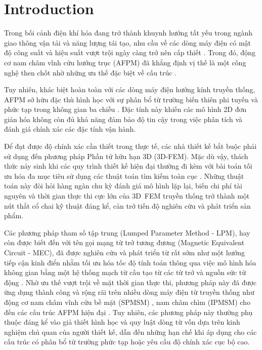 \section{Introduction}
Trong bối cảnh điện khí hóa đang trở thành khuynh hướng tất yếu trong ngành giao thông vận tải và năng lượng tái tạo, nhu cầu về các dòng máy điện có mật độ công suất và hiệu suất vượt trội ngày càng trở nên cấp thiết . Trong đó, động cơ nam châm vĩnh cửu hướng trục (AFPM) đã khẳng định vị thế là một công nghệ then chốt nhờ những ưu thế đặc biệt về cấu trúc \cite{jenkins2023innovations,gieras2008axial,capponi2012recent,xu2021comparative}. 

Tuy nhiên, khác biệt hoàn toàn với các dòng máy điện hướng kính truyền thống, AFPM sở hữu đặc thù hình học với sự phân bổ từ trường biến thiên phi tuyến và phức tạp trong không gian ba chiều \cite{vatani2025axial,ni2013investigation}. Đặc tính này khiến các mô hình 2D đơn giản hóa không còn đủ khả năng đảm bảo độ tin cậy trong việc phân tích và đánh giá chính xác các đặc tính vận hành. 

Để đạt được độ chính xác cần thiết trong thực tế, các nhà thiết kế bắt buộc phải sử dụng đến phương pháp Phần tử hữu hạn 3D (3D-FEM). Mặc dù vậy, thách thức nảy sinh khi các quy trình thiết kế hiện đại thường đi kèm với bài toán tối ưu hóa đa mục tiêu sử dụng các thuật toán tìm kiếm toàn cục \cite{huner2023design,subotic2019weight,liu2025optimization}. Những thuật toán này đòi hỏi hàng ngàn chu kỳ đánh giá mô hình lặp lại, biến chi phí tài nguyên và thời gian thực thi cực lớn của 3D~FEM truyền thống trở thành một nút thắt cổ chai kỹ thuật đáng kể, cản trở tiến độ nghiên cứu và phát triển sản phẩm.

Các phương pháp tham số tập trung (Lumped Parameter Method - LPM), hay còn được biết đến với tên gọi mạng từ trở tương đương (Magnetic Equivalent Circuit - MEC), đã được nghiên cứu và phát triển từ rất sớm như một hướng tiếp cận kinh điển nhằm tối ưu hóa tốc độ tính toán thông qua việc mô hình hóa không gian bằng một hệ thống mạch từ cấu tạo từ các từ trở và nguồn sức từ động . Nhờ ưu thế vượt trội về mặt thời gian thực thi, phương pháp này đã được ứng dụng thành công và rộng rãi trên nhiều dòng máy điện từ truyền thống như động cơ nam châm vĩnh cửu bề mặt (SPMSM) \cite{manju2018magnetic,cui2025equivalent,zhang2019equivalent,yang2011surface}, nam châm chìm (IPMSM) \cite{kemmetmuller2014modeling,zhu2009analytical,tariq2010iron} cho đến các cấu trúc AFPM hiện đại \cite{zhang20213,6971543,6600909,7869440} . Tuy nhiên, các phương pháp này thường phụ thuộc đáng kể vào giả thiết hình học và quy luật dòng từ vốn dựa trên kinh nghiệm chủ quan của người thiết kế, dẫn đến những hạn chế khi áp dụng cho các cấu trúc có phân bổ từ trường phức tạp hoặc yêu cầu độ chính xác cục bộ cao.

